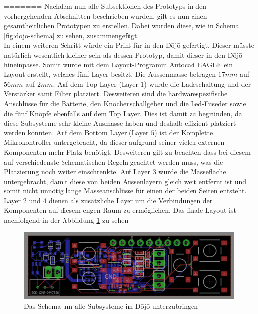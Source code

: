 =======
Nachdem nun alle Subsektionen des Prototyps in den vorhergehenden Abschnitten beschrieben wurden, gilt es nun einen gesamtheitlichen Prototypen zu erstellen. Dabei wurden diese, wie in Schema \ref{fig:dojo-schema} zu sehen, zusammengefügt.\\
In einem weiteren Schritt würde ein Print für in den Dōjō gefertigt. Dieser müsste natürlich wesentlich kleiner sein als dessen Prototyp, damit dieser in den Dōjō hineinpasse. Somit wurde mit dem Layout-Programm Autocad EAGLE ein Layout erstellt, welches fünf Layer besitzt. Die Aussenmasse betragen $17mm$ auf $56mm$ auf $2mm$. Auf dem Top Layer (Layer $1$) wurde die Ladeschaltung und der Verstärker samt Filter platziert. Desweiteren sind die  hardwarespezifische Anschlüsse für die Batterie, den Knochenschallgeber und die Led-Fuseder sowie die fünf Knöpfe ebenfalls auf dem Top Layer. Dies ist damit zu begründen, da diese Subsysteme sehr kleine Ausmasse haben und deshalb effizient platziert werden konnten. Auf dem Bottom Layer (Layer $5$) ist der Komplette Mikrokontroller untergebracht, da dieser aufgrund seiner vielen externen Komponenten mehr Platz benötigt. Desweiteren gilt zu beachten dass bei diesem auf verschiedenste Schematischen Regeln geachtet werden muss, was die Platzierung noch weiter einschrenkte. Auf Layer $3$ wurde die Massefläche untergebracht, damit diese von beiden Aussenlayern gleich weit entfernt ist und somit nicht unnötig lange Masseanschlüsse für einen der beiden Seiten entsteht. Layer $2$ und $4$ dienen als zusätzliche Layer um die Verbindungen der Komponenten auf diesem engen Raum zu ermöglichen. Das finale Layout ist nachfolgend in der Abbildung \ref{fig:Dojo_layout} zu sehen.
\begin{figure}[H]
	\begin{center}
		\includegraphics[width=160mm]{data/dojo_layout.png}
		\caption[Das Schema um alle Subsysteme im Dōjō unterzubringen]{Das Schema um alle Subsysteme im Dōjō unterzubringen} %
		\label{fig:Dojo_layout}
	\end{center}
\end{figure}

